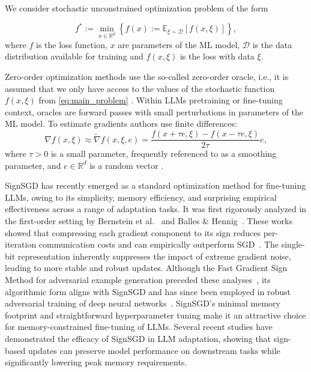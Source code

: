 \documentclass{article}
\theoremstyle{plain}
\theoremstyle{definition}
\theoremstyle{remark}
\newcommand{\EEb}[2]{\mathbb{E}_{#1}\left[ #2 \right]}
\begin{document}
We consider stochastic unconstrained optimization problem of the form

\begin{equation}
\label{eq:main_problem}
    f^* := \min_{x \in \mathbb{R}^d} \left\{ f(x) := \EEb{\xi \sim \mathcal{D}}{f(x, \xi)} \right\},
\end{equation}
where $f$ is the loss function, $x$ are parameters of the ML model, $\mathcal{D}$ is the data distribution available for training and $f(x, \xi)$ is the loss with data $\xi$. 

Zero-order optimization methods use the so-called zero-order oracle, i.e., it is assumed that we only have access to the values of the stochastic function $f(x, \xi)$ from \eqref{eq:main_problem} \cite{flaxman2005online,ghadimi2013stochastic}. Within LLMs pretraining or fine-tuning context, oracles are forward passes with small perturbations in parameters of the ML model. To estimate gradients authors use finite differences: 
\begin{equation}
\label{eq:zo_grad}
    \nabla f(x, \xi) \approx \widetilde{\nabla} f(x, \xi, e) = \frac{f(x + \tau e, \xi) - f(x - \tau e, \xi)}{2\tau} e,
\end{equation}
where $ \tau > 0 $ is a small parameter, frequently referenced to as a smoothing parameter, and $e \in \mathbb{R}^d$ is a random vector \cite{nesterov2017random,duchi2015optimal}.

SignSGD has recently emerged as a standard optimization method for fine-tuning LLMs, owing to its simplicity, memory efficiency, and surprising empirical effectiveness across a range of adaptation tasks. 
It was first rigorously analyzed in the first-order setting by Bernstein et al.~\cite{bernstein2018signsgd} and Balles \& Hennig~\cite{balles2017dissecting}. 
These works showed that compressing each gradient component to its sign reduces per-iteration communication costs and can empirically outperform SGD~\cite{shrivastava2015communication}. 
The single-bit representation inherently suppresses the impact of extreme gradient noise, leading to more stable and robust updates. Although the Fast Gradient Sign Method for adversarial example generation preceded these analyses~\cite{goodfellow2015explaining}, its algorithmic form aligns with SignSGD and has since been employed in robust adversarial training of deep neural networks~\cite{madry2018towards}. 
SignSGD’s minimal memory footprint and straightforward hyperparameter tuning make it an attractive choice for memory-constrained fine-tuning of LLMs. 
Several recent studies have demonstrated the efficacy of SignSGD in LLM adaptation, showing that sign-based updates can preserve model performance on downstream tasks while significantly lowering peak memory requirements.
\end{document}
